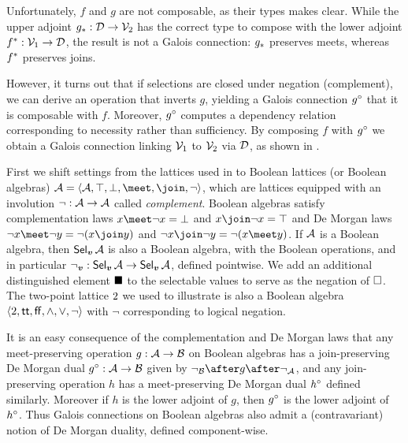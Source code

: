 

\noindent Unfortunately, $f$ and $g$ are not composable, as their types makes clear. While the upper adjoint ${g}_*: \mathcal{D} \to \mathcal{V}_2$ has the correct type to compose with the lower adjoint ${f}^*: \mathcal{V}_1 \to \mathcal{D}$, the result is not a Galois connection: ${g}_*$ preserves meets, whereas ${f}^*$ preserves joins.

However, it turns out that if selections are closed under negation (complement), we can derive an operation that inverts $g$, yielding a Galois connection ${g}^{\circ}$ that it is composable with $f$. Moreover, ${g}^{\circ}$ computes a dependency relation corresponding to necessity rather than sufficiency. By composing $f$ with ${g}^{\circ}$ we obtain a Galois connection linking $\mathcal{V}_1$ to $\mathcal{V}_2$ via $\mathcal{D}$, as shown in .

First we shift settings from the lattices used in  to Boolean lattices (or Boolean algebras) $\Ann{A}= \BoolLattice{\Ann{A}}{\top}{\bot}{\meet}{\join}{\neg}$, which are lattices equipped with an involution $\neg: \mathcal{A} \to \mathcal{A}$ called \emph{complement}. Boolean algebras satisfy complementation laws $x \meet \neg x = \bot$ and $x \join \neg x = \top$ and De Morgan laws $\neg x \meet \neg y = \neg(x \join y)$ and $\neg x \join \neg y = \neg(x \meet y)$. If $\mathcal{A}$ is a Boolean algebra, then $\textup{\textsf{Sel}}_{\bm{v}}\,{\mathcal{A}}$ is also a Boolean algebra, with the Boolean operations, and in particular $\neg_{\bm{v}}: \textup{\textsf{Sel}}_{\bm{v}}\,{\mathcal{A}} \to \textup{\textsf{Sel}}_{\bm{v}}\,{\mathcal{A}}$, defined pointwise. We add an additional distinguished element $\blacksquare$ to the selectable values to serve as the negation of $\square$. The two-point lattice $2$ we used to illustrate  is also a Boolean algebra $\langle2,\mathsf{tt},\mathsf{ff},\wedge,\vee,\neg\rangle$ with $\neg$ corresponding to logical negation.



It is an easy consequence of the complementation and De Morgan laws that any meet-preserving operation $g: \mathcal{A} \to \mathcal{B}$ on Boolean algebras has a join-preserving De Morgan dual ${g}^{\circ}: \mathcal{A} \to \mathcal{B}$ given by $\neg_{\Ann{B}} \after g\after \neg_{\Ann{A}}$, and any join-preserving operation $h$ has a meet-preserving De Morgan dual ${h}^{\circ}$ defined similarly. Moreover if $h$ is the lower adjoint of $g$, then ${g}^{\circ}$ is the lower adjoint of ${h}^{\circ}$. Thus Galois connections on Boolean algebras also admit a (contravariant) notion of De Morgan duality, defined component-wise.

